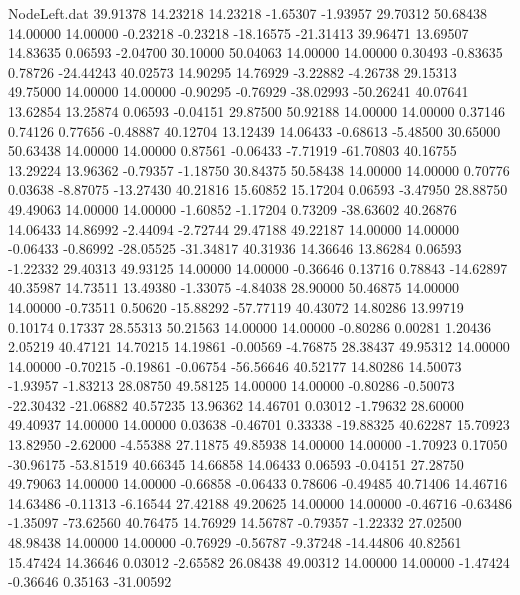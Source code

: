 \begin{filecontents}{NodeLeft.dat}
  39.91378   14.23218   14.23218    -1.65307   -1.93957   29.70312   50.68438   14.00000   14.00000   -0.23218   -0.23218  -18.16575  -21.31413
  39.96471   13.69507   14.83635     0.06593   -2.04700   30.10000   50.04063   14.00000   14.00000    0.30493   -0.83635    0.78726  -24.44243
  40.02573   14.90295   14.76929    -3.22882   -4.26738   29.15313   49.75000   14.00000   14.00000   -0.90295   -0.76929  -38.02993  -50.26241
  40.07641   13.62854   13.25874     0.06593   -0.04151   29.87500   50.92188   14.00000   14.00000    0.37146    0.74126    0.77656   -0.48887
  40.12704   13.12439   14.06433    -0.68613   -5.48500   30.65000   50.63438   14.00000   14.00000    0.87561   -0.06433   -7.71919  -61.70803
  40.16755   13.29224   13.96362    -0.79357   -1.18750   30.84375   50.58438   14.00000   14.00000    0.70776    0.03638   -8.87075  -13.27430
  40.21816   15.60852   15.17204     0.06593   -3.47950   28.88750   49.49063   14.00000   14.00000   -1.60852   -1.17204    0.73209  -38.63602
  40.26876   14.06433   14.86992    -2.44094   -2.72744   29.47188   49.22187   14.00000   14.00000   -0.06433   -0.86992  -28.05525  -31.34817
  40.31936   14.36646   13.86284     0.06593   -1.22332   29.40313   49.93125   14.00000   14.00000   -0.36646    0.13716    0.78843  -14.62897
  40.35987   14.73511   13.49380    -1.33075   -4.84038   28.90000   50.46875   14.00000   14.00000   -0.73511    0.50620  -15.88292  -57.77119
  40.43072   14.80286   13.99719     0.10174    0.17337   28.55313   50.21563   14.00000   14.00000   -0.80286    0.00281    1.20436    2.05219
  40.47121   14.70215   14.19861    -0.00569   -4.76875   28.38437   49.95312   14.00000   14.00000   -0.70215   -0.19861   -0.06754  -56.56646
  40.52177   14.80286   14.50073    -1.93957   -1.83213   28.08750   49.58125   14.00000   14.00000   -0.80286   -0.50073  -22.30432  -21.06882
  40.57235   13.96362   14.46701     0.03012   -1.79632   28.60000   49.40937   14.00000   14.00000    0.03638   -0.46701    0.33338  -19.88325
  40.62287   15.70923   13.82950    -2.62000   -4.55388   27.11875   49.85938   14.00000   14.00000   -1.70923    0.17050  -30.96175  -53.81519
  40.66345   14.66858   14.06433     0.06593   -0.04151   27.28750   49.79063   14.00000   14.00000   -0.66858   -0.06433    0.78606   -0.49485
  40.71406   14.46716   14.63486    -0.11313   -6.16544   27.42188   49.20625   14.00000   14.00000   -0.46716   -0.63486   -1.35097  -73.62560
  40.76475   14.76929   14.56787    -0.79357   -1.22332   27.02500   48.98438   14.00000   14.00000   -0.76929   -0.56787   -9.37248  -14.44806
  40.82561   15.47424   14.36646     0.03012   -2.65582   26.08438   49.00312   14.00000   14.00000   -1.47424   -0.36646    0.35163  -31.00592

\end{filecontents}
